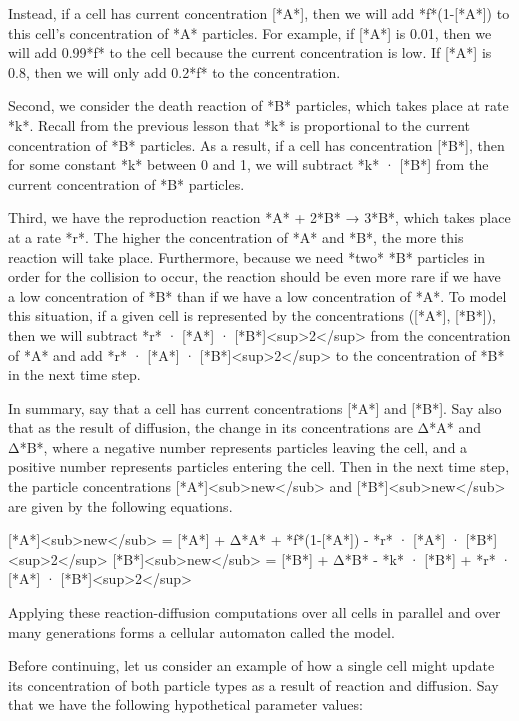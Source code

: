 {{Instead, if a cell has current concentration [*A*], then we will add *f*(1-[*A*]) to this cell's concentration of *A* particles. For example, if [*A*] is 0.01, then we will add 0.99*f* to the cell because the current concentration is low. If [*A*] is 0.8, then we will only add 0.2*f* to the concentration.

Second, we consider the death reaction of *B* particles, which takes place at rate *k*. Recall from the previous lesson that *k* is proportional to the current concentration of *B* particles. As a result, if a cell has concentration [*B*], then for some constant *k* between 0 and 1, we will subtract *k* · [*B*] from the current concentration of *B* particles.

Third, we have the reproduction reaction *A* + 2*B* → 3*B*, which takes place at a rate *r*. The higher the concentration of *A* and *B*, the more this reaction will take place. Furthermore, because we need *two* *B* particles in order for the collision to occur, the reaction should be even more rare if we have a low concentration of *B* than if we have a low concentration of *A*. To model this situation, if a given cell is represented by the concentrations ([*A*], [*B*]), then we will subtract *r* · [*A*] · [*B*]<sup>2</sup> from the concentration of *A* and add *r* · [*A*] · [*B*]<sup>2</sup> to the concentration of *B* in the next time step.

In summary, say that a cell has current concentrations [*A*] and [*B*]. Say also that as the result of diffusion, the change in its concentrations are Δ*A* and Δ*B*, where a negative number represents particles leaving the cell, and a positive number represents particles entering the cell. Then in the next time step, the particle concentrations [*A*]<sub>new</sub> and [*B*]<sub>new</sub> are given by the following equations.

[*A*]<sub>new</sub> = [*A*] + Δ*A* +  *f*(1-[*A*]) - *r* · [*A*] · [*B*]<sup>2</sup>
[*B*]<sub>new</sub> = [*B*] + Δ*B* - *k* · [*B*] + *r* · [*A*] · [*B*]<sup>2</sup>

Applying these reaction-diffusion computations over all cells in parallel and over many generations forms a cellular automaton called the  model.

Before continuing, let us consider an example of how a single cell might update its concentration of both particle types as a result of reaction and diffusion.  Say that we have the following hypothetical parameter values:

}}
